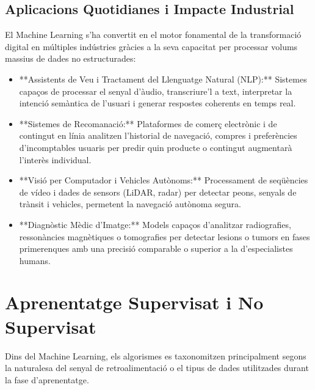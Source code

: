 \documentclass[11pt, a4paper]{article}
\begin{document}
\subsection{Aplicacions Quotidianes i Impacte Industrial}
El Machine Learning s'ha convertit en el motor fonamental de la transformació digital en múltiples indústries gràcies a la seva capacitat per processar volums massius de dades no estructurades:
\begin{itemize}
    \item **Assistents de Veu i Tractament del Llenguatge Natural (NLP):** Sistemes capaços de processar el senyal d'àudio, transcriure'l a text, interpretar la intenció semàntica de l'usuari i generar respostes coherents en temps real.
    \item **Sistemes de Recomanació:** Plataformes de comerç electrònic i de contingut en línia analitzen l'historial de navegació, compres i preferències d'incomptables usuaris per predir quin producte o contingut augmentarà l'interès individual.
    \item **Visió per Computador i Vehicles Autònoms:** Processament de seqüències de vídeo i dades de sensors (LiDAR, radar) per detectar peons, senyals de trànsit i vehicles, permetent la navegació autònoma segura.
    \item **Diagnòstic Mèdic d'Imatge:** Models capaços d'analitzar radiografies, ressonàncies magnètiques o tomografies per detectar lesions o tumors en fases primerenques amb una precisió comparable o superior a la d'especialistes humans.
\end{itemize}

\section{Aprenentatge Supervisat i No Supervisat}

Dins del Machine Learning, els algorismes es taxonomitzen principalment segons la naturalesa del senyal de retroalimentació o el tipus de dades utilitzades durant la fase d'aprenentatge.
\end{document}
